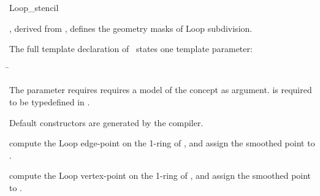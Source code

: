 \begin{ccRefClass}{Loop_stencil}

\ccDefinition

\ccClassTemplateName , derived from , 
defines the geometry masks of Loop subdivision. 


\ccParameters

The full template declaration of \ccClassTemplateName\ states one
template parameter:

\begin{tabbing}
 \=\\
\end{tabbing}
   
The  parameter requires requires a model of 
the  concept as argument. 
 is required to be typedefined in .

\ccCreation

Default constructors are generated by the compiler.

\ccThree{}{}{}

{compute the Loop edge-point on the 1-ring of , 
and assign the smoothed point to .}

{compute the Loop vertex-point on the 1-ring of , 
and assign the smoothed point to .}


\ccSeeAlso

\\
\\

\end{ccRefClass}

\ccRefPageEnd


